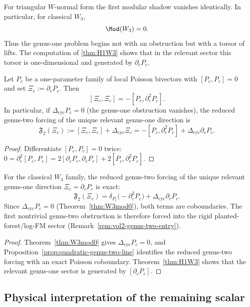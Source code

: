 For triangular $W$-normal form the first modular shadow vanishes identically. In particular,
for classical $W_3$,
\[
\Mod(W_3)=0.
\]
Thus the genus-one problem begins not with an obstruction but with a torsor of lifts. The
computation of \cref{thm:H1W3} shows that in the relevant sector this torsor is one-dimensional
and generated by $\partial_cP_c$.

\begin{proposition}
\label{prop:quadratic-genus-two-line}
Let $P_c$ be a one-parameter family of local Poisson bivectors with
$[P_c,P_c]=0$ and set $\Xi_c:=\partial_cP_c$. Then
\[
[\Xi_c,\Xi_c]=-[P_c,\partial_c^2P_c].
\]
In particular, if $\Delta_{\mathrm{cyc}}P_c=0$ \textup{(}the genus-one
obstruction vanishes\textup{)}, the reduced genus-two forcing of the
unique relevant genus-one direction is
\[
\mathfrak{F}_2(\Xi_c)
:=
[\Xi_c,\Xi_c]+\Delta_{\mathrm{cyc}}\Xi_c
=
-[P_c,\partial_c^2P_c]+\Delta_{\mathrm{cyc}}\partial_cP_c.
\]
\end{proposition}

\begin{proof}
Differentiate $[P_c,P_c]=0$ twice:
$0=\partial_c^2[P_c,P_c]=2[\partial_cP_c,\partial_cP_c]+2[P_c,\partial_c^2P_c]$.
\end{proof}

\begin{corollary}
\label{cor:w3-no-quadratic-self-obstruction}
For the classical $W_3$ family, the reduced genus-two forcing of the
unique relevant genus-one direction $\Xi_c=\partial_cP_c$ is exact:
\[
\mathfrak{F}_2(\Xi_c)
=
\delta_{P_c}\bigl(-\partial_c^2P_c\bigr)
+\Delta_{\mathrm{cyc}}\partial_cP_c.
\]
Since $\Delta_{\mathrm{cyc}}P_c=0$
\textup{(}Theorem~\textup{\ref{thm:W3mod0})}, both terms are
coboundaries. The first nontrivial genus-two obstruction is
therefore forced into the rigid planted-forest/log-FM sector
\textup{(}Remark~\textup{\ref{rem:vol2-genus-two-entry})}.
\end{corollary}

\begin{proof}
Theorem~\ref{thm:W3mod0} gives $\Delta_{\mathrm{cyc}}P_c=0$, and
Proposition~\ref{prop:quadratic-genus-two-line} identifies the reduced
genus-two forcing with an exact Poisson coboundary. Theorem~\ref{thm:H1W3}
shows that the relevant genus-one sector is generated by $[\partial_cP_c]$.
\end{proof}

\subsection{Physical interpretation of the remaining scalar}

